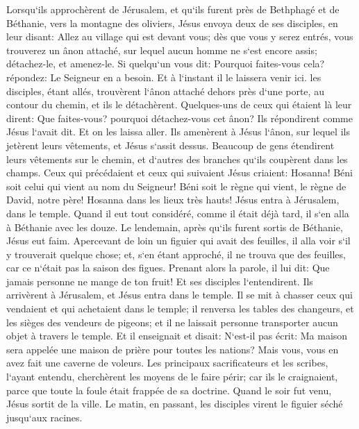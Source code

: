 \verse Lorsqu`ils approchèrent de Jérusalem, et qu`ils furent près de Bethphagé et de Béthanie, vers la montagne des oliviers, Jésus envoya deux de ses disciples, 
\verse en leur disant: Allez au village qui est devant vous; dès que vous y serez entrés, vous trouverez un ânon attaché, sur lequel aucun homme ne s`est encore assis; détachez-le, et amenez-le. 
\verse Si quelqu`un vous dit: Pourquoi faites-vous cela? répondez: Le Seigneur en a besoin. Et à l`instant il le laissera venir ici. 
\verse les disciples, étant allés, trouvèrent l`ânon attaché dehors près d`une porte, au contour du chemin, et ils le détachèrent. 
\verse Quelques-uns de ceux qui étaient là leur dirent: Que faites-vous? pourquoi détachez-vous cet ânon? 
\verse Ils répondirent comme Jésus l`avait dit. Et on les laissa aller. 
\verse Ils amenèrent à Jésus l`ânon, sur lequel ils jetèrent leurs vêtements, et Jésus s`assit dessus. 
\verse Beaucoup de gens étendirent leurs vêtements sur le chemin, et d`autres des branches qu`ils coupèrent dans les champs. 
\verse Ceux qui précédaient et ceux qui suivaient Jésus criaient: Hosanna! Béni soit celui qui vient au nom du Seigneur! 
\verse Béni soit le règne qui vient, le règne de David, notre père! Hosanna dans les lieux très hauts! 
\verse Jésus entra à Jérusalem, dans le temple. Quand il eut tout considéré, comme il était déjà tard, il s`en alla à Béthanie avec les douze. 
\verse Le lendemain, après qu`ils furent sortis de Béthanie, Jésus eut faim. 
\verse Apercevant de loin un figuier qui avait des feuilles, il alla voir s`il y trouverait quelque chose; et, s`en étant approché, il ne trouva que des feuilles, car ce n`était pas la saison des figues. 
\verse Prenant alors la parole, il lui dit: Que jamais personne ne mange de ton fruit! Et ses disciples l`entendirent. 
\verse Ils arrivèrent à Jérusalem, et Jésus entra dans le temple. Il se mit à chasser ceux qui vendaient et qui achetaient dans le temple; il renversa les tables des changeurs, et les sièges des vendeurs de pigeons; 
\verse et il ne laissait personne transporter aucun objet à travers le temple. 
\verse Et il enseignait et disait: N`est-il pas écrit: Ma maison sera appelée une maison de prière pour toutes les nations? Mais vous, vous en avez fait une caverne de voleurs. 
\verse Les principaux sacrificateurs et les scribes, l`ayant entendu, cherchèrent les moyens de le faire périr; car ils le craignaient, parce que toute la foule était frappée de sa doctrine. 
\verse Quand le soir fut venu, Jésus sortit de la ville. 
\verse Le matin, en passant, les disciples virent le figuier séché jusqu`aux racines. 
